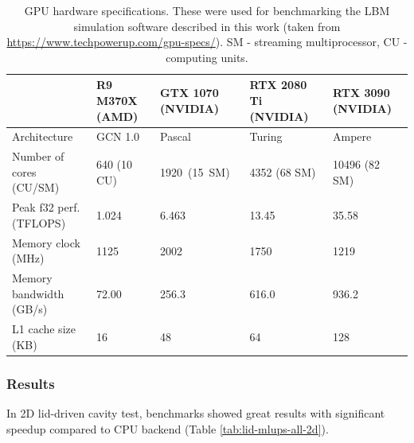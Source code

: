 \begin{table}[!ht]
	\centering\small
	{\renewcommand{\arraystretch}{1.1}%
		{\setlength{\tabcolsep}{0.4em}
	\begin{tabular}{ |p{4.3cm}||p{2.1cm}|p{2.2cm}|p{2.2cm}|p{2.5cm}| }
		\hline
		& R9 M370X \newline(AMD) & GTX 1070 \newline(NVIDIA) & RTX 2080 Ti \newline(NVIDIA) & RTX 3090 \newline(NVIDIA) \\
		\hline
		Architecture   & GCN 1.0 & Pascal  & Turing &  Ampere  \\
		\hline
		Number of cores (CU/SM)   & 640 (10 CU) & 1920~(15~SM)   &  4352 (68 SM) &  10496 (82 SM) \\
		\hline
		Peak f32 perf. (TFLOPS)   & 1.024  & 6.463  & 13.45 &  35.58 \\
		\hline
		Memory clock (MHz)   & 1125  & 2002   & 1750 &   1219 \\
		\hline
		Memory bandwidth (GB/s)   & 72.00  & 256.3   & 616.0 &   936.2 \\
		\hline
		L1 cache size (KB)   & 16  & 48   & 64 &   128 \\
		\hline
	\end{tabular}}}
	\caption{GPU hardware specifications. These were used for benchmarking the LBM simulation software described in this work (taken from \url{https://www.techpowerup.com/gpu-specs/}). SM - streaming multiprocessor, CU - computing units.}
	\label{tab:gpus}
\end{table}

\subsubsection{Results}

In 2D lid-driven cavity test, benchmarks showed great results with significant speedup compared to CPU backend (Table \ref{tab:lid-mlups-all-2d}).

